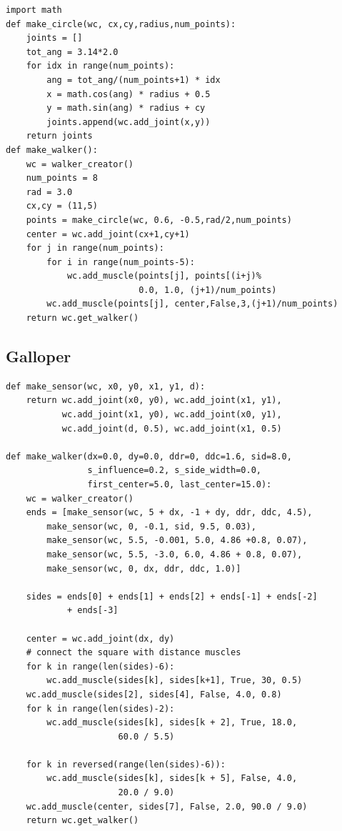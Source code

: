 \documentclass{article}
\begin{document}
\begin{verbatim}
import math
def make_circle(wc, cx,cy,radius,num_points):
    joints = []
    tot_ang = 3.14*2.0
    for idx in range(num_points):
        ang = tot_ang/(num_points+1) * idx
        x = math.cos(ang) * radius + 0.5
        y = math.sin(ang) * radius + cy
        joints.append(wc.add_joint(x,y))
    return joints 
def make_walker():
    wc = walker_creator()
    num_points = 8
    rad = 3.0
    cx,cy = (11,5)
    points = make_circle(wc, 0.6, -0.5,rad/2,num_points)
    center = wc.add_joint(cx+1,cy+1)
    for j in range(num_points):
        for i in range(num_points-5):
            wc.add_muscle(points[j], points[(i+j)%
                          0.0, 1.0, (j+1)/num_points)
        wc.add_muscle(points[j], center,False,3,(j+1)/num_points)
    return wc.get_walker()
\end{verbatim}

\subsection{Galloper}
\begin{verbatim}
def make_sensor(wc, x0, y0, x1, y1, d):
    return wc.add_joint(x0, y0), wc.add_joint(x1, y1), 
           wc.add_joint(x1, y0), wc.add_joint(x0, y1), 
           wc.add_joint(d, 0.5), wc.add_joint(x1, 0.5)
           
def make_walker(dx=0.0, dy=0.0, ddr=0, ddc=1.6, sid=8.0,
                s_influence=0.2, s_side_width=0.0, 
                first_center=5.0, last_center=15.0):
    wc = walker_creator() 
    ends = [make_sensor(wc, 5 + dx, -1 + dy, ddr, ddc, 4.5),
        make_sensor(wc, 0, -0.1, sid, 9.5, 0.03),
        make_sensor(wc, 5.5, -0.001, 5.0, 4.86 +0.8, 0.07),
        make_sensor(wc, 5.5, -3.0, 6.0, 4.86 + 0.8, 0.07),
        make_sensor(wc, 0, dx, ddr, ddc, 1.0)]

    sides = ends[0] + ends[1] + ends[2] + ends[-1] + ends[-2] 
            + ends[-3]

    center = wc.add_joint(dx, dy)
    # connect the square with distance muscles
    for k in range(len(sides)-6):
        wc.add_muscle(sides[k], sides[k+1], True, 30, 0.5)
    wc.add_muscle(sides[2], sides[4], False, 4.0, 0.8)
    for k in range(len(sides)-2):
        wc.add_muscle(sides[k], sides[k + 2], True, 18.0, 
                      60.0 / 5.5)

    for k in reversed(range(len(sides)-6)):
        wc.add_muscle(sides[k], sides[k + 5], False, 4.0, 
                      20.0 / 9.0)
    wc.add_muscle(center, sides[7], False, 2.0, 90.0 / 9.0)
    return wc.get_walker()
\end{verbatim}
\end{document}
